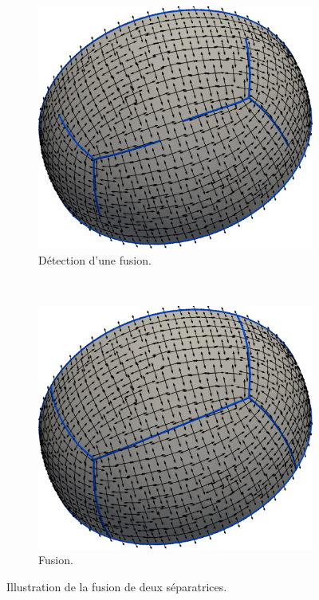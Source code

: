 \begin{figure}[h!]
\centering
\begin{subfigure}{0.525\textwidth}
    \includegraphics[width=\textwidth]{images/detect_fusion_space.pdf}
    \caption{Détection d'une fusion.}
\end{subfigure}
\\[0.2cm]
\begin{subfigure}{0.525\textwidth}
    \includegraphics[width=\textwidth]{images/fusion_space.pdf}
    \caption{Fusion.}
\end{subfigure}
\caption{Illustration de la fusion de deux séparatrices.}
\label{fig:fusion_space}
\end{figure}

